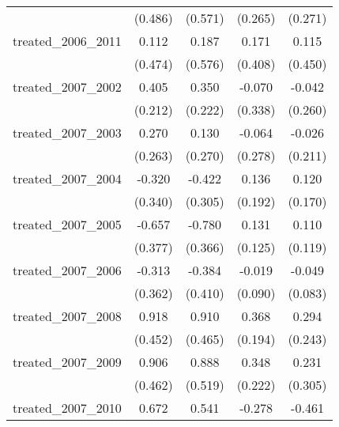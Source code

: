 {\begin{tabular}{l*{4}{c}}
            &     (0.486)         &     (0.571)         &     (0.265)         &     (0.271)         \\
[1em]
treated\_2006\_2011&       0.112         &       0.187         &       0.171         &       0.115         \\
            &     (0.474)         &     (0.576)         &     (0.408)         &     (0.450)         \\
[1em]
treated\_2007\_2002&       0.405         &       0.350         &      -0.070         &      -0.042         \\
            &     (0.212)         &     (0.222)         &     (0.338)         &     (0.260)         \\
[1em]
treated\_2007\_2003&       0.270         &       0.130         &      -0.064         &      -0.026         \\
            &     (0.263)         &     (0.270)         &     (0.278)         &     (0.211)         \\
[1em]
treated\_2007\_2004&      -0.320         &      -0.422         &       0.136         &       0.120         \\
            &     (0.340)         &     (0.305)         &     (0.192)         &     (0.170)         \\
[1em]
treated\_2007\_2005&      -0.657         &      -0.780\sym{*}  &       0.131         &       0.110         \\
            &     (0.377)         &     (0.366)         &     (0.125)         &     (0.119)         \\
[1em]
treated\_2007\_2006&      -0.313         &      -0.384         &      -0.019         &      -0.049         \\
            &     (0.362)         &     (0.410)         &     (0.090)         &     (0.083)         \\
[1em]
treated\_2007\_2008&       0.918\sym{*}  &       0.910         &       0.368         &       0.294         \\
            &     (0.452)         &     (0.465)         &     (0.194)         &     (0.243)         \\
[1em]
treated\_2007\_2009&       0.906         &       0.888         &       0.348         &       0.231         \\
            &     (0.462)         &     (0.519)         &     (0.222)         &     (0.305)         \\
[1em]
treated\_2007\_2010&       0.672         &       0.541         &      -0.278         &      -0.461         \\

\end{tabular}}
